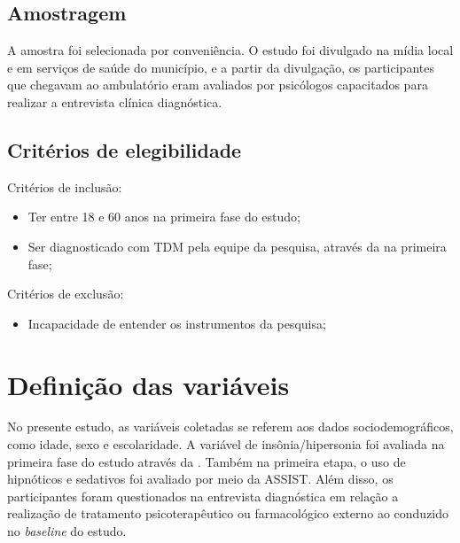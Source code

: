 \documentclass[chapter=TITLE,
               oneside,
               12pt,
               a4paper,
               english,
               brazil]{abntex2}    %
\begin{document}
        \subsection{Amostragem} 
    
            A amostra foi selecionada por conveniência. O estudo foi divulgado na mídia
            local e em serviços de saúde do município, e a partir da divulgação,
            os participantes que chegavam ao ambulatório eram avaliados por psicólogos
            capacitados para realizar a entrevista clínica diagnóstica.

        \subsection{Critérios de elegibilidade}

            Critérios de inclusão:

            \begin{itemize}

                \item Ter entre 18 e 60 anos na primeira fase do estudo;

                \item Ser diagnosticado com TDM pela equipe da pesquisa,
                    através da  na primeira fase;

            \end{itemize}

            Critérios de exclusão:

            \begin{itemize}

                \item Incapacidade de entender os instrumentos da pesquisa;

    \end{itemize}

    \section{Definição das variáveis}\label{sec:variaveis}

        No presente estudo, as variáveis coletadas se referem aos dados
        sociodemográficos, como idade, sexo e escolaridade.
        A variável de insônia/hipersonia foi avaliada na primeira fase do estudo
        através da . Também na primeira etapa, o uso de hipnóticos
        e sedativos foi avaliado por meio da ASSIST. Além disso, os participantes
        foram questionados na entrevista diagnóstica em relação a realização
        de tratamento psicoterapêutico ou farmacológico externo ao conduzido no
        \textit{baseline} do estudo.
\end{document}
